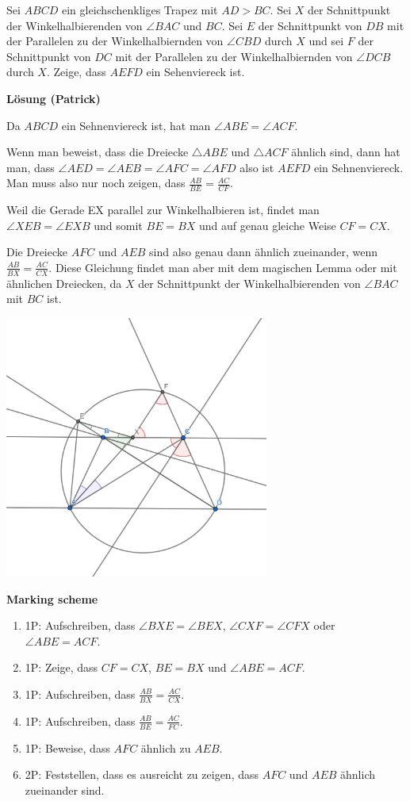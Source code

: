 Sei $ABCD$ ein gleichschenkliges Trapez mit $AD>BC$. Sei $X$ der Schnittpunkt der Winkelhalbierenden von $\angle BAC$ und $BC$. Sei $E$ der Schnittpunkt von $DB$ mit der Parallelen zu der Winkelhalbiernden von $\angle CBD$ durch $X$ und sei $F$ der Schnittpunkt von $DC$ mit der Parallelen zu der Winkelhalbiernden von $\angle DCB$ durch $X$. Zeige, dass $AEFD$ ein Sehenviereck ist.

\textbf{Lösung (Patrick)}

 Da $ABCD$ ein Sehnenviereck ist, hat man $\angle ABE = \angle ACF$.
 
 Wenn man beweist, dass die Dreiecke $\triangle ABE$ und $\triangle ACF$ ähnlich sind, dann hat man, dass $\angle AED = \angle AEB = \angle AFC = \angle AFD$ also ist $AEFD$ ein Sehnenviereck.
 Man muss also nur noch zeigen, dass $\frac{AB}{BE} = \frac{AC}{CF}$.
 
Weil die Gerade EX parallel zur Winkelhalbieren ist, findet man $\angle XEB = \angle EXB$ und somit $BE = BX$ und auf genau gleiche Weise $CF = CX$.

Die Dreiecke $AFC$ und $AEB$ sind also genau dann ähnlich zueinander, wenn $\frac{AB}{BX} = \frac{AC}{CX}$. 
Diese Gleichung findet man aber mit dem magischen Lemma oder mit ähnlichen Dreiecken, da $X$ der Schnittpunkt der Winkelhalbierenden von $\angle BAC$ mit $BC$ ist.

\begin{center}
\includegraphics[trim={3cm 1cm 1cm 3.5cm}, clip, width =0.65\textwidth]{f7_picture.JPG}
\end{center}

\textbf{Marking scheme} 
\begin{enumerate}

\item 1P: Aufschreiben, dass $\angle BXE = \angle BEX$, $\angle CXF = \angle CFX$ oder $\angle ABE = ACF$.
\item 1P: Zeige, dass $CF=CX$, $BE= BX$ und $\angle ABE = ACF$.
\item 1P: Aufschreiben, dass $\frac{AB}{BX} = \frac{AC}{CX}$.
\item 1P: Aufschreiben, dass $\frac{AB}{BE} = \frac{AC}{FC}$.
\item 1P: Beweise, dass $AFC$ ähnlich zu $AEB$. 
\item 2P: Feststellen, dass es ausreicht zu zeigen, dass $AFC$ und $AEB$ ähnlich zueinander sind. 

   
\end{enumerate}{}